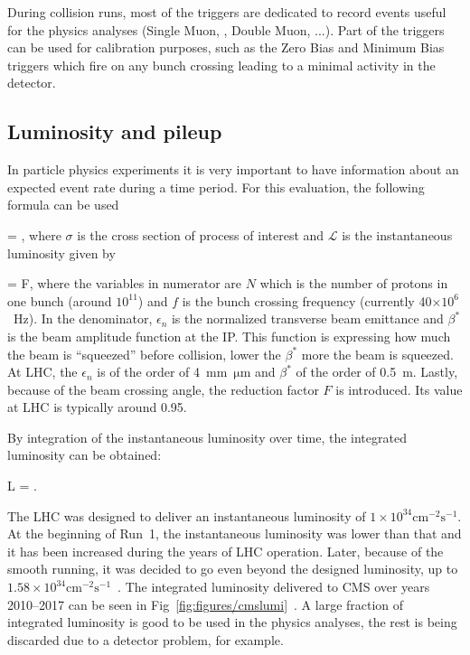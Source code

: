 
During collision runs, most of the triggers are dedicated to record events useful for the physics analyses (Single Muon, \MET, Double Muon, ...). Part of the triggers can be used for calibration purposes, such as the Zero Bias and Minimum Bias triggers which fire on any bunch crossing leading to a minimal activity in the detector.

\subsection{Luminosity and pileup}

In particle physics experiments it is very important to have information about an expected event rate during a time period. For this evaluation, the following formula can be used

{
  = \sigma \times {},
}
where $\sigma$ is the cross section of process of interest and $\mathcal{L}$ is the instantaneous luminosity given by

{
  = F,
}
where the variables in numerator are $N$ which is the number of protons in one bunch (around $10^{11}$) and $f$ is the bunch crossing frequency (currently 40$\times 10^{6}$~Hz). In the denominator, $\epsilon_{n}$ is the normalized transverse beam emittance and $\beta^{*}$ is the beam amplitude function at the IP. This function is expressing how much the beam is ``squeezed'' before collision, lower the $\beta^{*}$ more the beam is squeezed. At LHC, the  $\epsilon_{n}$ is of the order of 4~mm~$\mathrm{\mu m}$ and $\beta^{*}$ of the order of 0.5~m. Lastly, because of the beam crossing angle, the reduction factor $F$ is introduced. Its value at LHC is typically around 0.95.

By integration of the instantaneous luminosity over time, the integrated luminosity can be obtained:

{
 L = .
}

The LHC was designed to deliver an instantaneous luminosity of $1 \times 10^{34} \mathrm{cm^{-2}s^{-1}}$. At the beginning of Run~1, the instantaneous luminosity was lower than that and it has been increased during the years of LHC operation. Later, because of the smooth running, it was decided to go even beyond the designed luminosity, up to $1.58 \times 10^{34} \mathrm{cm^{-2}s^{-1}}$~\cite{Pralavorio:2272474}. The integrated luminosity delivered to CMS over years 2010--2017 can be seen in Fig~\ref{fig:figures/cmslumi}~\cite{website:CMSlumi}. A large fraction of integrated luminosity is good to be used in the physics analyses, the rest is being discarded due to a detector problem, for example. 



